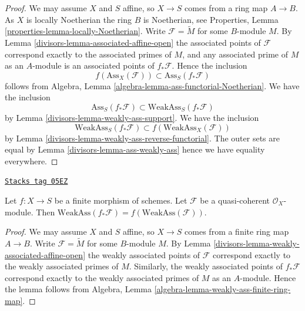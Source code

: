 \begin{proof}

We may assume $X$ and $S$ affine, so $X \to S$ comes from a ring map
$A \to B$. As $X$ is locally Noetherian the ring $B$ is Noetherian, see
Properties, Lemma \ref{properties-lemma-locally-Noetherian}.
Write $\mathcal{F} = \widetilde M$ for some $B$-module $M$. By
Lemma \ref{divisors-lemma-associated-affine-open}
the associated points of $\mathcal{F}$ correspond exactly to the associated
primes of $M$, and any associated prime of $M$ as an $A$-module is an
associated points of $f_*\mathcal{F}$.
Hence the inclusion
$$
f(\text{Ass}_X(\mathcal{F})) \subset \text{Ass}_S(f_*\mathcal{F})
$$
follows from
Algebra, Lemma \ref{algebra-lemma-ass-functorial-Noetherian}.
We have the inclusion
$$
\text{Ass}_S(f_*\mathcal{F}) \subset \text{WeakAss}_S(f_*\mathcal{F})
$$
by
Lemma \ref{divisors-lemma-weakly-ass-support}.
We have the inclusion
$$
\text{WeakAss}_S(f_*\mathcal{F}) \subset f(\text{WeakAss}_X(\mathcal{F}))
$$
by
Lemma \ref{divisors-lemma-weakly-ass-reverse-functorial}.
The outer sets are equal by
Lemma \ref{divisors-lemma-ass-weakly-ass}
hence we have equality everywhere.
\end{proof}

\begin{lemma}
\label{divisors-lemma-weakly-associated-finite}
\href{https://stacks.math.columbia.edu/tag/05EZ}{\texttt{Stacks tag 05EZ}}

Let $f : X \to S$ be a finite morphism of schemes.
Let $\mathcal{F}$ be a quasi-coherent $\mathcal{O}_X$-module.
Then $\text{WeakAss}(f_*\mathcal{F}) = f(\text{WeakAss}(\mathcal{F}))$.
\end{lemma}

\begin{proof}

We may assume $X$ and $S$ affine, so $X \to S$ comes from a finite ring map
$A \to B$. Write $\mathcal{F} = \widetilde M$ for some $B$-module $M$. By
Lemma \ref{divisors-lemma-weakly-associated-affine-open}
the weakly associated points of $\mathcal{F}$ correspond exactly to the
weakly associated primes of $M$. Similarly, the weakly associated points
of $f_*\mathcal{F}$ correspond exactly to the weakly associated primes
of $M$ as an $A$-module. Hence the lemma follows from
Algebra, Lemma \ref{algebra-lemma-weakly-ass-finite-ring-map}.
\end{proof}

